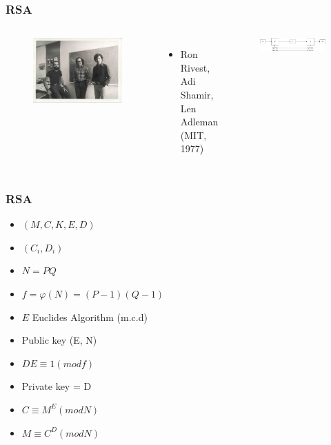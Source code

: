 \documentclass{beamer}
\begin{document}
\begin{frame}
\frametitle{RSA}
\begin{columns}[c] %

\begin{figure}
\includegraphics[width=0.9\linewidth]{rsa.png}
\end{figure}

\begin{itemize}
\item Ron Rivest, Adi Shamir, Len Adleman (MIT, 1977)
\end{itemize}
\begin{figure}
\includegraphics[width=0.9\linewidth]{cpri.png}
\end{figure}
\end{columns}
\end{frame}

\begin{frame}[fragile]
\frametitle{RSA}
\begin{itemize}
\item $(M,C,K,E,D)$
\item $(C_{i} ,D_{i})$
\item $N= PQ$
\item $f = \varphi (N ) = (P − 1)(Q − 1)$
\item $E$ Euclides Algorithm (m.c.d)
\item Public key (E, N)
\item $DE \equiv  1(mod f )$
\item Private key = D
\item $C \equiv  M^{E }(mod N )$
\item $M \equiv  { C}^{D } (mod N )$
\end{itemize}
\end{frame}
\end{document}
